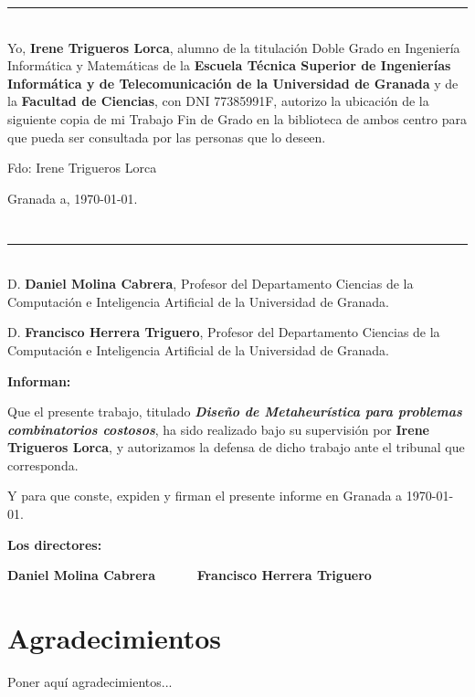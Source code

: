 \noindent\rule[-1ex]{\textwidth}{2pt}\\[4.5ex]

Yo, \textbf{Irene Trigueros Lorca}, alumno de la titulación Doble Grado en Ingeniería Informática y Matemáticas de la \textbf{Escuela Técnica Superior
de Ingenierías Informática y de Telecomunicación de la Universidad de Granada} y de la \textbf{Facultad de Ciencias}, con DNI 77385991F, autorizo la
ubicación de la siguiente copia de mi Trabajo Fin de Grado en la biblioteca de ambos centro para que pueda ser
consultada por las personas que lo deseen.

\vspace{6cm}

\noindent Fdo: Irene Trigueros Lorca

\vspace{2cm}

\begin{flushright}
Granada a, \today.
\end{flushright}


\chapter*{}
\thispagestyle{empty}

\noindent\rule[-1ex]{\textwidth}{2pt}\\[4.5ex]

D. \textbf{Daniel Molina Cabrera}, Profesor del Departamento Ciencias de la Computación e Inteligencia Artificial de la Universidad de Granada.

\vspace{0.5cm}

D. \textbf{Francisco Herrera Triguero}, Profesor del Departamento Ciencias de la Computación e Inteligencia Artificial de la Universidad de Granada.


\vspace{0.5cm}

\textbf{Informan:}

\vspace{0.5cm}

Que el presente trabajo, titulado \textit{\textbf{Diseño de Metaheurística para problemas combinatorios costosos}},
ha sido realizado bajo su supervisión por \textbf{Irene Trigueros Lorca}, y autorizamos la defensa de dicho trabajo ante el tribunal
que corresponda.

\vspace{0.5cm}

Y para que conste, expiden y firman el presente informe en Granada a \today.

\vspace{1cm}

\textbf{Los directores:}

\vspace{5cm}

\noindent \textbf{Daniel Molina Cabrera \ \ \ \ \ Francisco Herrera Triguero}

\chapter*{Agradecimientos}
\thispagestyle{empty}

       \vspace{1cm}


Poner aquí agradecimientos...

